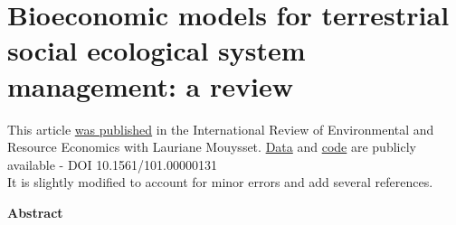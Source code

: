 \chapter{Bioeconomic models for terrestrial social ecological system management: a review}
\label{chapter1}
\onehalfspacing

\begin{center}
\begin{minipage}{0.9\textwidth}
This article \href{https://sim-jean.github.io/files/research/jean_mouysset2022.pdf}{was published} in the International Review of Environmental and Resource Economics with Lauriane Mouysset. \href{https://zenodo.org/records/6656433}{Data} and \href{https://github.com/sim-jean/review-irere/tree/main}{code} are publicly available - DOI 10.1561/101.00000131\\
It is slightly modified to account for minor errors and add several references.
\end{minipage}

\vspace*{1cm}

\textbf{Abstract}\par
    \vspace*{.2cm}
    \noindent


\end{center}
